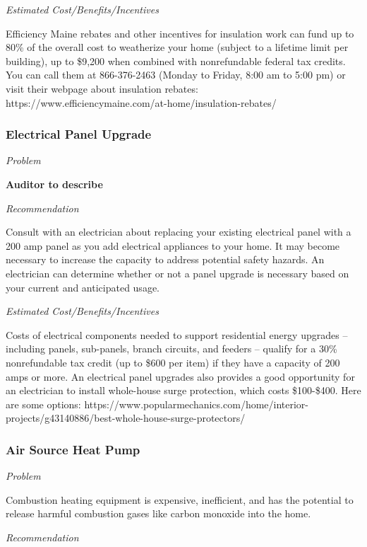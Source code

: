 \documentclass[
  letterpaper,
  DIV=11,
  numbers=noendperiod]{scrartcl}
\begin{document}
\emph{Estimated Cost/Benefits/Incentives}

Efficiency Maine rebates and other incentives for insulation work can
fund up to 80\% of the overall cost to weatherize your home (subject to
a lifetime limit per building), up to \$9,200 when combined with
nonrefundable federal tax credits. You can call them at 866-376-2463
(Monday to Friday, 8:00 am to 5:00 pm) or visit their webpage about
insulation rebates:
https://www.efficiencymaine.com/at-home/insulation-rebates/

\subsubsection{Electrical Panel Upgrade}\label{electrical-panel-upgrade}

\emph{Problem}

\textbf{Auditor to describe}

\emph{Recommendation}

Consult with an electrician about replacing your existing electrical
panel with a 200 amp panel as you add electrical appliances to your
home. It may become necessary to increase the capacity to address
potential safety hazards. An electrician can determine whether or not a
panel upgrade is necessary based on your current and anticipated usage.

\emph{Estimated Cost/Benefits/Incentives}

Costs of electrical components needed to support residential energy
upgrades -- including panels, sub-panels, branch circuits, and feeders
-- qualify for a 30\% nonrefundable tax credit (up to \$600 per item) if
they have a capacity of 200 amps or more. An electrical panel upgrades
also provides a good opportunity for an electrician to install
whole-house surge protection, which costs \$100-\$400. Here are some
options:
https://www.popularmechanics.com/home/interior-projects/g43140886/best-whole-house-surge-protectors/

\subsubsection{Air Source Heat Pump}\label{air-source-heat-pump}

\emph{Problem}

Combustion heating equipment is expensive, inefficient, and has the
potential to release harmful combustion gases like carbon monoxide into
the home.

\emph{Recommendation}
\end{document}
